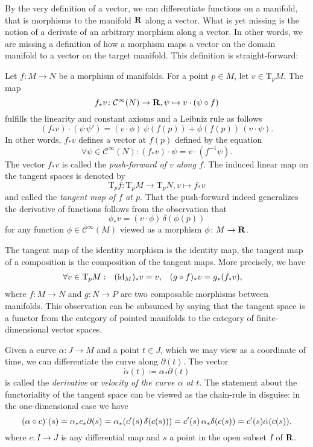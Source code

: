 By the very definition of a vector, we can differentiate functions on a 
manifold, that is morphisms to the manifold $\mathbf{R}$ along a vector. What is
yet missing is the notion of a derivate of an arbitrary morphism along a vector.
In other words, we are missing a definition of how a morphism maps a vector on
the domain manifold to a vector on the target manifold. This definition is
straight-forward:

Let $f\colon M \to N$ be a morphism of manifolds. For a point $p \in M$, let
$v \in \mathrm T_p M$. The map
\[
  f_* v\colon \mathcal C^\infty(N) \to \mathbf{R}, \psi \mapsto
  v \cdot (\psi \circ f)
\]
fulfills the linearity and constant axioms and a Leibniz rule as follows
\[
  (f_* v) \cdot (\psi \, \psi') = (v \cdot \phi) \, \psi(f(p)) +
    \phi(f(p)) \, (v \cdot \psi).
\]
In other words, $f_* v$ defines a vector at $f(p)$ defined by the equation
\[
  \forall \psi \in \mathcal C^\infty(N): (f_* v) \cdot \psi = v \cdot (f^{-1} \psi).
\]
The vector $f_* v$ is called the \emph{push-forward of $v$ along $f$}. The
induced linear map on the tangent spaces is denoted by
\[
  \mathrm T_p f\colon \mathrm T_p M \to \mathrm T_p N, v \mapsto f_* v
\]
and called the \emph{tangent map of $f$ at $p$}. That the push-forward
indeed generalizes the derivative of functions follows from the observation that
\[
  \phi_* v = (v \cdot \phi) \, \delta(\phi(p))
\]
for any function $\phi \in \mathcal C^\infty(M)$ viewed as a morphism
$\phi\colon M \to \mathbf{R}$.

The tangent map of the identity morphism is the identity map, the tangent map
of a composition is the composition of the tangent maps. More precisely, we
have
\[
  \begin{aligned}
    \forall v \in \mathrm T_p M: &&
    (\mathrm{id}_M)_* v & = v, &
    (g \circ f)_* v & = g_* (f_* v),
  \end{aligned}
\]
where $f\colon M \to N$ and $g\colon N \to P$ are two composable morphisms
between manifolds. This observation can be subsumed by saying that the
tangent space is a functor from the category of pointed manifolds to the
category of finite-dimensional vector spaces. 

Given a curve $\alpha\colon J \to M$ and a point $t \in J$, which we may view
as a coordinate of time, we can differentiate the curve along $\partial(t)$.
The vector
\[
  \dot\alpha(t) \coloneqq \alpha_* \partial(t)
\]
is called the \emph{derivative} or \emph{velocity of the curve $\alpha$ at $t$}.
The statement about the functoriality of the tangent space can be viewed as the
chain-rule in disguise: in the one-dimensional case we have
\[
  (\alpha \circ c)\spdot(s) = \alpha_* c_* \partial(s)
  = \alpha_* (c'(s) \, \delta(c(s)))
  = c'(s) \, \alpha_* \delta(c(s)) = c'(s) \dot\alpha(c(s)),
\]
where $c\colon I \to J$ is any differential map and $s$ a point in the open
subset $I$ of $\mathbf{R}$.

